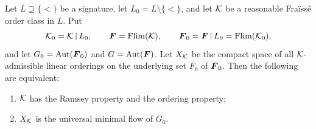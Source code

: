 \begin{theorem}
    \label{thm:umf-iff-ramsey-ordering}
    Let \(L\supseteq\{<\}\) be a signature, let \(L_0=L\setminus\{<\}\), and let \(\mathcal{K}\) be a reasonable Fraïssé order class in \(L\). Put
    \[
        \mathcal{K}_0=\mathcal{K}\!\restriction\!L_0,
        \qquad
        \boldsymbol{F}=\operatorname{Flim}(\mathcal{K}),
        \qquad
        \boldsymbol{F}_0=\boldsymbol{F}\!\restriction\!L_0=\operatorname{Flim}(\mathcal{K}_0),
    \]
    and let \(G_0=\operatorname{Aut}(\boldsymbol{F}_0)\) and \(G=\operatorname{Aut}(\boldsymbol{F})\).
    Let \(X_{\mathcal{K}}\) be the compact space of all \(\mathcal{K}\)-admissible linear orderings on the underlying set \(F_0\) of \(\boldsymbol{F}_0\). Then the following are equivalent:

    \begin{enumerate}
        \item[(i)] \(\mathcal{K}\) has the Ramsey property and the ordering property;
        \item[(ii)] \(X_{\mathcal{K}}\) is the universal minimal flow of \(G_0\).
    \end{enumerate}
\end{theorem}


